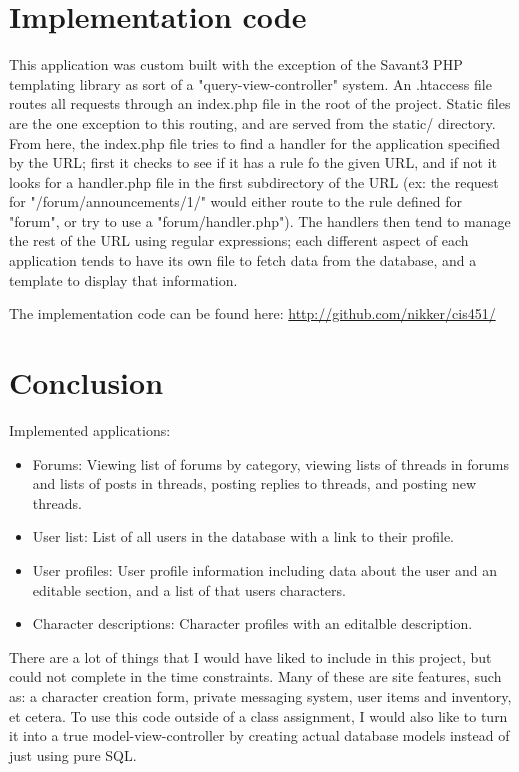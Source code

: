 \documentclass{book}
\begin{document}
\section{Implementation code}
This application was custom built with the exception of the Savant3 PHP templating library as sort of a "query-view-controller" system.  An .htaccess file routes all requests through an index.php file in the root of the project.  Static files are the one exception to this routing, and are served from the static/ directory.  From here, the index.php file tries to find a handler for the application specified by the URL; first it checks to see if it has a rule fo the given URL, and if not it looks for a handler.php file in the first subdirectory of the URL (ex: the request for "/forum/announcements/1/" would either route to the rule defined for "forum", or try to use a "forum/handler.php").  The handlers then tend to manage the rest of the URL using regular expressions; each different aspect of each application tends to have its own file to fetch data from the database, and a template to display that information.

The implementation code can be found here: \url{http://github.com/nikker/cis451/}

\newpage
\section{Conclusion}
Implemented applications:
\begin{itemize}
	\item Forums: Viewing list of forums by category, viewing lists of threads in forums and lists of posts in threads, posting replies to threads, and posting new threads.
	\item User list: List of all users in the database with a link to their profile.
	\item User profiles: User profile information including data about the user and an editable section, and a list of that users characters.
	\item Character descriptions:  Character profiles with an editalble description.
\end{itemize}

There are a lot of things that I would have liked to include in this project, but could not complete in the time constraints.  Many of these are site features, such as: a character creation form, private messaging system, user items and inventory, et cetera.  To use this code outside of a class assignment, I would also like to turn it into a true model-view-controller by creating actual database models instead of just using pure SQL.
\end{document}
